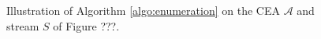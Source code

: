 \begin{figure}[H]
  \centering
  \begin{subfigure}[t]{0.24\linewidth}
  \end{subfigure}
  \begin{subfigure}[t]{0.24\linewidth}
  \end{subfigure}
  \begin{subfigure}[t]{0.24\linewidth}
  \end{subfigure}
  \begin{subfigure}[t]{0.24\linewidth}
  \end{subfigure}
  \caption{Illustration of Algorithm \ref{algo:enumeration} on the CEA $\mathcal{A}$ and stream $S$ of Figure ???.}
  \label{fig:label}
\end{figure}




